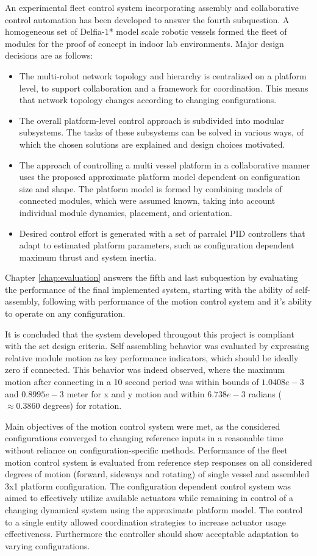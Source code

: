 An experimental fleet control system incorporating assembly and collaborative control automation has been developed to answer the fourth subquestion. A homogeneous set of Delfia-1* model scale robotic vessels formed the fleet of modules for the proof of concept in indoor lab environments. Major design decisions are as follows:
\begin{itemize}
	\item The multi-robot network topology and hierarchy is centralized on a platform level, to support collaboration and a framework for coordination. This means that network topology changes according to changing configurations. 
	\item The overall platform-level control approach is subdivided into modular subsystems. The tasks of these subsystems can be solved in various ways, of which the chosen solutions are explained and design choices motivated. 
	\item The approach of controlling a multi vessel platform in a collaborative manner uses the proposed approximate platform model dependent on configuration size and shape. The platform model is formed by combining models of connected modules, which were assumed known, taking into account individual module dynamics, placement, and orientation. 
	\item Desired control effort is generated with a set of parralel PID controllers that adapt to estimated platform parameters, such as configuration dependent maximum thrust and system inertia. 
\end{itemize} 
Chapter \ref{chap:evaluation} answers the fifth and last subquestion by evaluating the performance of the final implemented system, starting with the ability of self-assembly, following with performance of the motion control system and it's ability to operate on any configuration. 

It is concluded that the system developed througout this project is compliant with the set design criteria. Self assembling behavior was evaluated by expressing relative module motion as key performance indicators, which should be ideally zero if connected. This behavior was indeed observed, where the maximum motion after connecting in a 10 second period was within bounds of $1.0408e-3$ and $0.8995e-3$ meter for x and y motion and within $6.738e-3$ radians ($\approx 0.3860$ degrees) for rotation. 


Main objectives of the motion control system were met, as the considered configurations converged to changing reference inputs in a reasonable time without reliance on configuration-specific methods. Performance of the fleet motion control system is evaluated from reference step responses on all considered degrees of motion (forward, sideways and rotating) of single vessel and assembled 3x1 platform configuration.  The configuration dependent control system was aimed to effectively utilize available actuators while remaining in control of a changing dynamical system using the approximate platform model. The control to a single entity allowed coordination strategies to increase actuator usage effectiveness. Furthermore the controller should show acceptable adaptation to varying configurations. 

